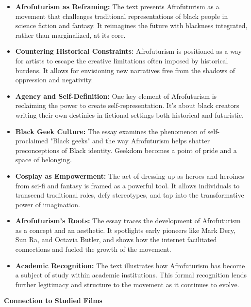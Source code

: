 \documentclass[11pt,fleqn]{book}
\begin{document}
\begin{itemize}
\item \textbf{Afrofuturism as Reframing:} The text presents Afrofuturism as a movement that challenges traditional representations of black people in science fiction and fantasy. It reimagines the future with blackness integrated, rather than marginalized, at its core.

\item \textbf{Countering Historical Constraints:} Afrofuturism is positioned as a way for artists to escape the creative limitations often imposed by historical burdens. It allows for envisioning new narratives free from the shadows of oppression and negativity.

\item \textbf{Agency and Self-Definition:} One key element of Afrofuturism is reclaiming the power to create self-representation. It's about black creators writing their own destinies in fictional settings both historical and futuristic. 

\item \textbf{Black Geek Culture:} The essay examines the phenomenon of self-proclaimed "Black geeks" and the way Afrofuturism helps shatter preconceptions of Black identity.  Geekdom becomes a point of pride and a space of belonging.

\item \textbf{Cosplay as Empowerment:} The act of dressing up as heroes and heroines from sci-fi and fantasy is framed as a powerful tool. It allows individuals to transcend traditional roles, defy stereotypes, and tap into the transformative power of imagination.

\item \textbf{Afrofuturism's Roots:} The essay traces the development of Afrofuturism as a concept and an aesthetic. It spotlights early pioneers like Mark Dery, Sun Ra, and Octavia Butler, and shows how the internet facilitated connections and fueled the growth of the movement.

\item \textbf{Academic Recognition:}  The text illustrates how Afrofuturism has become a subject of study within academic institutions. This formal recognition lends further legitimacy and structure to the movement as it continues to evolve. 
\end{itemize}
\vspace{5pt}
\textbf{Connection to Studied Films}
\end{document}
